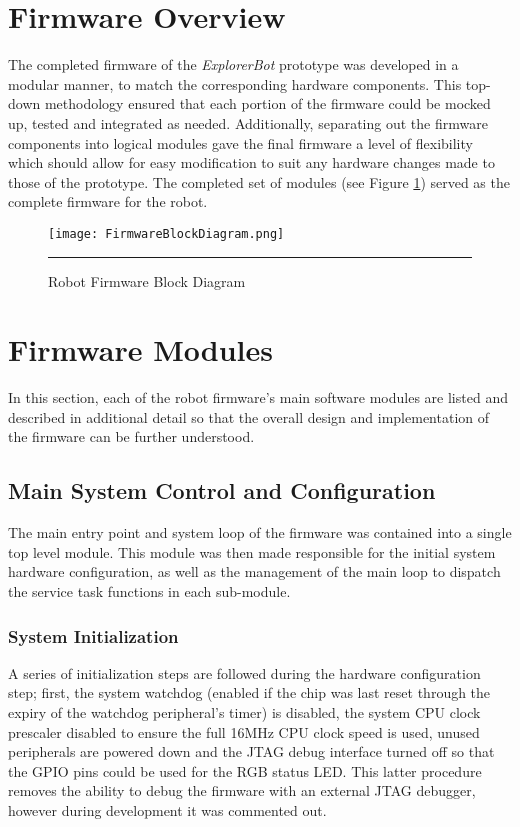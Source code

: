 \section{Firmware Overview}

The completed firmware of the \textit{ExplorerBot} prototype was developed in a modular manner, to match the corresponding hardware components. This top-down methodology ensured that each portion of the firmware could be mocked up, tested and integrated as needed. Additionally, separating out the firmware components into logical modules gave the final firmware a level of flexibility which should allow for easy modification to suit any hardware changes made to those of the prototype. The completed set of modules (see Figure \ref{fig:robotblockfw}) served as the complete firmware for the robot.

\begin{figure}[H]
	\vspace{1em}
	\centering
		\texttt{[image: FirmwareBlockDiagram.png]}
	\rule{35em}{0.5pt}
	\caption[Firmware Block Diagram]{Robot Firmware Block Diagram}
	\label{fig:robotblockfw}
\end{figure}

\section{Firmware Modules}

In this section, each of the robot firmware's main software modules are listed and described in additional detail so that the overall design and implementation of the firmware can be further understood.

\FloatBarrier
\subsection{Main System Control and Configuration}

The main entry point and system loop of the firmware was contained into a single top level module. This module was then made responsible for the initial system hardware configuration, as well as the management of the main loop to dispatch the service task functions in each sub-module.

\FloatBarrier
\subsubsection{System Initialization}

A series of initialization steps are followed during the hardware configuration step; first, the system watchdog (enabled if the chip was last reset through the expiry of the watchdog peripheral's timer) is disabled, the system CPU clock prescaler disabled to ensure the full 16MHz CPU clock speed is used, unused peripherals are powered down and the JTAG debug interface turned off so that the GPIO pins could be used for the RGB status LED. This latter procedure removes the ability to debug the firmware with an external JTAG debugger, however during development it was commented out.

